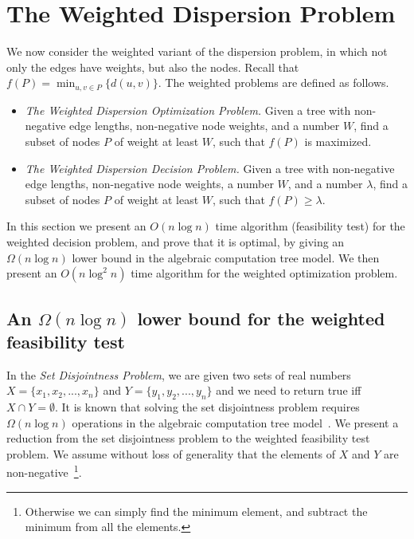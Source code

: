 \documentclass[11pt,a4paper]{article}
\theoremstyle{definition}
\theoremstyle{remark}
\begin{document}
\section{The Weighted Dispersion Problem}
We now consider the weighted variant of the dispersion problem, in which not only the edges have weights, but also the nodes. Recall that $f(P)=\min_{u,v\in P} \{d(u,v)\}$. The weighted problems are defined as follows.
\begin{itemize} 
\item {\em The Weighted Dispersion Optimization Problem.} Given a tree with non-negative edge lengths, non-negative node weights, and a number $W$, find a subset of nodes $P$ of weight at least $W$, such that  $f(P)$ is maximized. 

\item {\em The Weighted Dispersion Decision Problem.} Given a tree with non-negative edge lengths, non-negative node weights, a number $W$, and a number $\lambda$, find a subset of nodes  $P$ of weight at least $W$, such that $f(P)\geq\lambda$. 
\end{itemize}


In this section we present an $O(n\log n)$ time algorithm (feasibility test) for the weighted decision problem, and prove that it is optimal, by giving an $\Omega(n\log n)$ lower bound in the algebraic computation tree model. We then present an $O(n\log^2 n)$ time algorithm for the weighted optimization problem. 

\subsection{An \boldmath$ \Omega (n\log n)$ lower bound for the weighted feasibility test}

In the {\em Set Disjointness Problem}, we are given two sets of real numbers $X=\lbrace x_1,x_2,...,x_n \rbrace$ and $Y=\lbrace y_1,y_2,...,y_n \rbrace$ and we need to return true iff $X \cap Y = \emptyset$. 
It is known that solving the set disjointness problem requires $\Omega(n \log n)$ operations in the algebraic
computation tree model~\cite{BenOr}. %
We present a reduction from the set disjointness problem to the weighted feasibility test problem. We assume without loss of generality that the elements of $X$ and $Y$ are non-negative~\footnote{Otherwise
we can simply find the minimum element, and subtract the minimum from all the elements.}.
\end{document}
